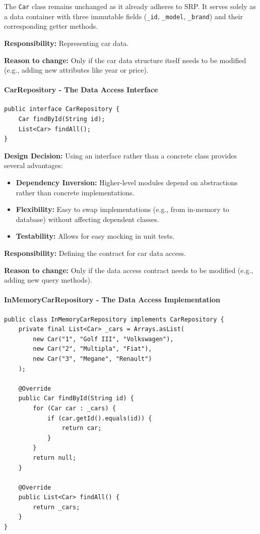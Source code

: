 The \texttt{Car} class remains unchanged as it already adheres to SRP. It serves solely as a data container with three immutable fields (\texttt{\_id}, \texttt{\_model}, \texttt{\_brand}) and their corresponding getter methods.

\textbf{Responsibility:} Representing car data.

\textbf{Reason to change:} Only if the car data structure itself needs to be modified (e.g., adding new attributes like year or price).

\paragraph{CarRepository - The Data Access Interface}

\begin{verbatim}
public interface CarRepository {
    Car findById(String id);
    List<Car> findAll();
}
\end{verbatim}

\textbf{Design Decision:} Using an interface rather than a concrete class provides several advantages:
\begin{itemize}
    \item \textbf{Dependency Inversion:} Higher-level modules depend on abstractions rather than concrete implementations.
    \item \textbf{Flexibility:} Easy to swap implementations (e.g., from in-memory to database) without affecting dependent classes.
    \item \textbf{Testability:} Allows for easy mocking in unit tests.
\end{itemize}

\textbf{Responsibility:} Defining the contract for car data access.

\textbf{Reason to change:} Only if the data access contract needs to be modified (e.g., adding new query methods).

\paragraph{InMemoryCarRepository - The Data Access Implementation}

\begin{verbatim}
public class InMemoryCarRepository implements CarRepository {
    private final List<Car> _cars = Arrays.asList(
        new Car("1", "Golf III", "Volkswagen"),
        new Car("2", "Multipla", "Fiat"),
        new Car("3", "Megane", "Renault")
    );
    
    @Override
    public Car findById(String id) {
        for (Car car : _cars) {
            if (car.getId().equals(id)) {
                return car;
            }
        }
        return null;
    }
    
    @Override
    public List<Car> findAll() {
        return _cars;
    }
}
\end{verbatim}


